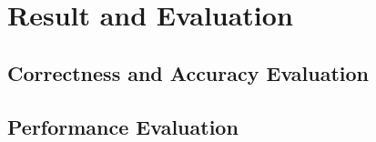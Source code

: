 \section{Result and Evaluation} \label{sec:eval}
\subsection{Correctness and Accuracy Evaluation}
\subsection{Performance Evaluation}